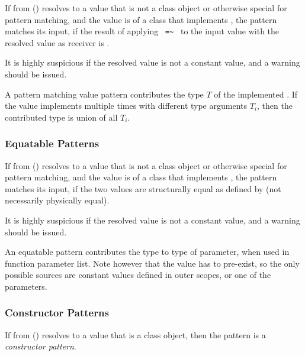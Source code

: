 If  from () resolves to a value that is not a class object or otherwise special for pattern matching, and the value is of a class that implements , the pattern matches its input, if the result of applying ~\lstinline!=~!~ to the input value with the resolved value as receiver is .

It is highly suspicious if the resolved value is not a constant value, and a warning should be issued. 

A pattern matching value pattern contributes the type $T$ of the implemented . If the value implements  multiple times with different type arguments $T_i$, then the contributed type is union of all $T_i$. 





\subsubsection{Equatable Patterns}
\label{sec:equatable-patterns}

If  from () resolves to a value that is not a class object or otherwise special for pattern matching, and the value is of a class that implements , the pattern matches its input, if the two values are structurally equal as defined by  (not necessarily physically equal).

It is highly suspicious if the resolved value is not a constant value, and a warning should be issued. 

An equatable pattern contributes the type  to type of parameter, when used in function parameter list. Note however that the value has to pre-exist, so the only possible sources are constant values defined in outer scopes, or one of the parameters.





\subsubsection{Constructor Patterns}
\label{sec:constructor-patterns}

If  from () resolves to a value that is a class object, then the pattern is a {\em constructor pattern}. 

